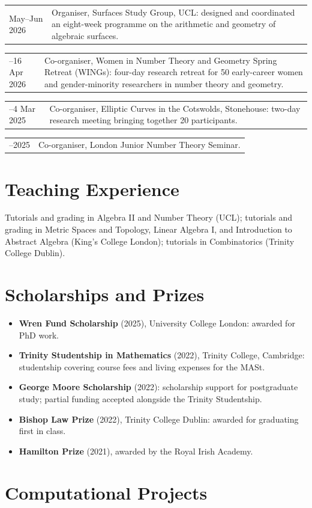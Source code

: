 \documentclass[a4paper,11pt]{article}
\makeatletter
\newcommand{\datedentry}[2]{%
  \begin{tabularx}{\textwidth}{
    @{}>{\raggedleft\arraybackslash}p{2.25cm}
    @{\hspace{0.45cm}}X@{}}
    #1 & #2
  \end{tabularx}\par\vspace{0.5pt}
}
\makeatother
\begin{document}
\datedentry{May--Jun 2026}
  {Organiser, Surfaces Study Group, UCL: designed and coordinated an
   eight-week programme on the arithmetic and geometry of algebraic surfaces.}

\datedentry{13--16 Apr 2026}
  {Co-organiser, Women in Number Theory and Geometry Spring Retreat (WINGs):
   four-day research retreat for 50 early-career women and gender-minority
   researchers in number theory and geometry.}

\datedentry{3--4 Mar 2025}
  {Co-organiser, Elliptic Curves in the Cotswolds, Stonehouse:
   two-day research meeting bringing together 20 participants.}

\datedentry{2024--2025}
  {Co-organiser, London Junior Number Theory Seminar.}

\section{Teaching Experience}

Tutorials and grading in Algebra II and Number Theory
(UCL); tutorials and grading in Metric Spaces and Topology, Linear Algebra I,
and Introduction to Abstract Algebra (King's College London); tutorials in
Combinatorics (Trinity College Dublin).

\section{Scholarships and Prizes}

\begin{itemize}
\item \textbf{Wren Fund Scholarship} (2025), University College London: awarded for PhD work.
  \item \textbf{Trinity Studentship in Mathematics} (2022), Trinity College,
    Cambridge: studentship covering course fees and living expenses for the MASt.
  \item \textbf{George Moore Scholarship} (2022): scholarship support for
    postgraduate study; partial funding accepted alongside the Trinity Studentship.
  \item \textbf{Bishop Law Prize} (2022), Trinity College Dublin: awarded for
    graduating first in class.
  \item \textbf{Hamilton Prize} (2021), awarded by the Royal Irish Academy.
\end{itemize}

\section{Computational Projects}
\end{document}
